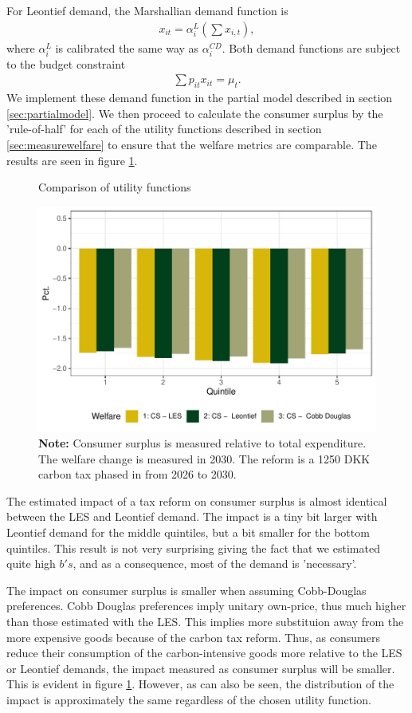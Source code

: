 For Leontief demand, the Marshallian demand
function is 
\begin{align}
    x_{it} = \alpha^{L}_i(\sum x_{i,t}),
\end{align}
where $\alpha^{L}_i$ is calibrated the same way as $\alpha^{CD}_i$. Both demand functions are subject to the budget constraint
\begin{align}
    \sum p_{it} x_{it} = \mu_t.
\end{align}
We implement these demand function in the partial model described in section \ref{sec:partialmodel}. We then proceed to calculate the consumer surplus by the 'rule-of-half' for each of the utility functions described in section \ref{sec:measurewelfare} to ensure that the welfare metrics are comparable. The results are seen in figure \ref{samlignnytte}.

\begin{figure}[H]
\centering
\caption{Comparison of utility functions}
\label{samlignnytte}
\includegraphics[width=.7\textwidth]{Figures/IO-resultater/bar_samlign_nyttefunk.pdf}
\captionsetup{singlelinecheck=off,size=scriptsize}
\setlength{\captionmargin}{10pt}
\caption*{
\textbf{Note:} Consumer surplus is measured relative to total expenditure. The welfare change is measured in 2030. The reform is a 1250 DKK carbon tax phased in from 2026 to 2030. \\}
\end{figure}
The estimated impact of a tax reform on consumer surplus is almost identical between the LES and Leontief demand. The impact is a tiny bit larger with Leontief demand for the middle quintiles, but a bit smaller for the bottom quintiles. This result is not very surprising giving the fact that we estimated quite high $b's$, and as a consequence, most of the demand is 'necessary'. 

The impact on consumer surplus is smaller when assuming Cobb-Douglas preferences. Cobb Douglas preferences imply unitary own-price, thus much higher than those estimated with the LES. This implies more substituion away from the more expensive goods because of the carbon tax reform. Thus, as consumers reduce their consumption of the carbon-intensive goods more relative to the LES or Leontief demands, the impact measured as consumer surplus will be smaller. This is evident in figure \ref{samlignnytte}. However, as can also be seen, the distribution of the impact is approximately the same regardless of the chosen utility function. 


